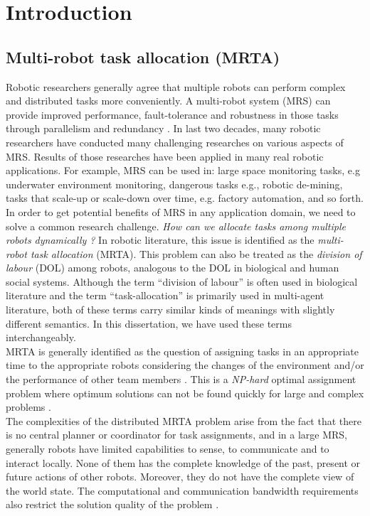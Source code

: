 \chapter{Introduction}
\label{intro}
\section{Multi-robot task allocation (MRTA)}
\label{intro:mrta}
Robotic researchers generally agree that multiple robots can perform complex and distributed tasks more conveniently. A multi-robot system (MRS) can provide improved performance, fault-tolerance and robustness in those tasks through parallelism and redundancy \cite{Arkin1998,Parker+2006,Mataric2007}. In last two decades, many robotic researchers have conducted many challenging researches on various aspects of MRS. Results of those researches have been applied   in many real robotic applications. For example, MRS can be used in: large space monitoring tasks, e.g underwater environment monitoring, dangerous tasks e.g., robotic de-mining, tasks that scale-up or scale-down over time, e.g. factory automation, and so forth.\\
In order to get potential benefits of MRS in any application domain, we need to solve a common research challenge. \textit{How can we allocate tasks among multiple robots dynamically ?} In robotic literature,  this issue is identified as the \textit{multi-robot task allocation} (MRTA). This problem can also be treated as the \textit{division of labour} (DOL) among robots, analogous to the DOL in biological  and human social systems. Although the term ``division of labour'' is often used in biological literature and the term ``task-allocation'' is primarily used in multi-agent literature, both of these terms carry similar kinds of meanings with slightly different semantics. In this dissertation, we have used these terms interchangeably.\\
MRTA is generally identified as the question of assigning tasks in an appropriate time to the appropriate robots considering the changes of the environment and/or the performance of other team members \cite{Gerkey+2003}. This is a {\em NP-hard} optimal assignment problem where optimum solutions can not be found quickly for large and complex problems \cite{Parker2008}.\\
The complexities of the distributed MRTA problem arise from the fact that there is no central planner or coordinator for task assignments, and in a large MRS, generally robots have limited capabilities to sense, to communicate and to interact locally. None of them has the complete knowledge of the past, present or future actions of other robots. Moreover, they do not have the complete view of the world state. The computational and communication bandwidth requirements also restrict the solution quality of the problem \cite{Gerkey+2004}.\\
